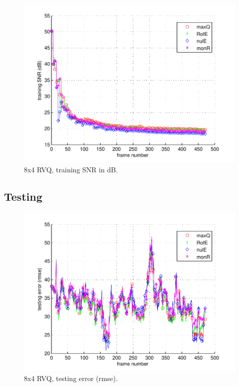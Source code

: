 								\begin{figure}[h!]
								\centering
								\includegraphics[height=0.4\textheight]{thesis/5_fish_8_4_1000_trg_SNRdB.pdf}
								\caption{8x4 RVQ, training SNR in dB.}
								\label{fig:5_fish_8_4_1000_trg_SNRdB}
								\end{figure}
\clearpage
\newpage
\subsection{Testing}
								\begin{figure}[h!]
								\centering
								\includegraphics[height=0.4\textheight]{thesis/5_fish_8_4_1000_tst_rmse.pdf}
								\caption{8x4 RVQ, testing error (rmse).}
								\label{fig:5_fish_8_4_1000_tst_rmse}
								\end{figure}


